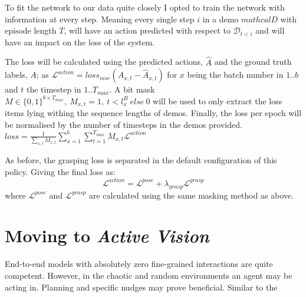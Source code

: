 To fit the network to our data quite closely I opted to train the network with information at every step. Meaning every single step $i$ in a demo $mathcal{D}$ with episode length $T$, will have an action predicted with respect to $\mathcal{D}_{t < i}$ and will have an impact on the loss of the system. 

The loss will be calculated using the predicted actions, $\hat{A}$ and the ground truth labels, $A$; as \( \mathcal{L}^{action} = {loss}_{mse}\left(A_{x, t} - \hat{A}_{x, t}\right)\) for $x$ being the batch number in $1..b$ and $t$ the timestep in $1..T_{max}$. A bit mask \(M \in \{0, 1\}^{b \times T_{max}}, ~M_{x, t} = 1, ~t < l^B_x ~else ~0\) will be used to only extract the loss items lying withing the sequence lengths of demos. Finally, the loss per epoch will be normalised by the number of timesteps in the demos provided. \(loss = \frac{1}{\sum_{x, t}M_{x, t}}{\sum_{x = 1}^{b}\sum_{t = 1}^{T_{max}}M_{x, t} \mathcal{L}^{action}}\)

As before, the grasping loss is separated in the default configuration of this policy. Giving the final loss as: 
\[
  \mathcal{L}^{action} = \mathcal{L}^{pose} + \lambda_{grasp} \mathcal{L}^{grasp}
\]
where $\mathcal{L}^{pose}$ and $\mathcal{L}^{grasp}$ are calculated using the same masking method as above.



\section{Moving to \emph{Active Vision}}
End-to-end models with absolutely zero fine-grained interactions are quite competent. However, in the chaotic and random environments an agent may be acting in. Planning and specific nudges may prove beneficial. Similar to the 



